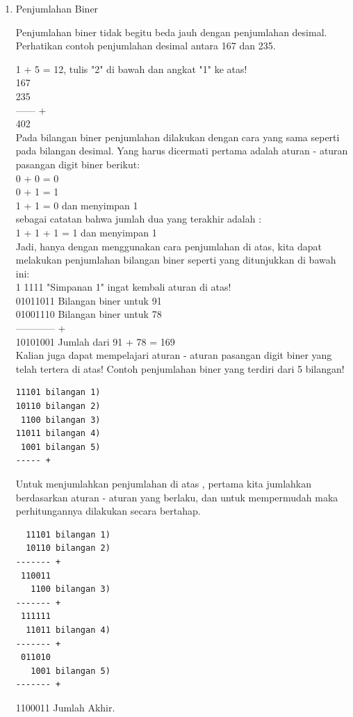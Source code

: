 \begin{enumerate}[label=(\alph*)]
\begin{enumerate}

\item Penjumlahan Biner

\qquad Penjumlahan biner tidak begitu beda jauh dengan penjumlahan desimal. Perhatikan contoh penjumlahan desimal antara 167 dan 235.

1  + 5 = 12, tulis "2" di bawah dan angkat "1" ke atas! \\

167 \\
235 \\
------ + \\
402 \\

\qquad Pada bilangan biner penjumlahan dilakukan dengan cara yang sama seperti pada bilangan desimal. Yang harus dicermati pertama adalah aturan - aturan pasangan digit biner berikut:\\
0 + 0 = 0 \\
0 + 1 = 1 \\
1 + 1 = 0 \textrightarrow dan menyimpan 1 \\

sebagai catatan bahwa jumlah dua yang terakhir adalah : \\
1 + 1 + 1 = 1 \textrightarrow dan menyimpan 1 \\

\qquad Jadi, hanya dengan menggunakan cara penjumlahan di atas, kita dapat melakukan penjumlahan bilangan biner seperti yang ditunjukkan di bawah ini: \\
1 1111 \textrightarrow "Simpanan 1" ingat kembali aturan di atas! \\
01011011 \textrightarrow Bilangan biner untuk 91 \\
01001110 \textrightarrow Bilangan biner untuk 78 \\
------------ + \\
10101001 \textrightarrow Jumlah dari 91 + 78 = 169 \\

\qquad Kalian juga dapat mempelajari aturan - aturan pasangan digit biner yang telah tertera di atas! Contoh penjumlahan biner yang terdiri dari 5 bilangan!\\
\begin{verbatim}
11101 bilangan 1)
10110 bilangan 2) 
 1100 bilangan 3)
11011 bilangan 4)
 1001 bilangan 5)
----- +
\end{verbatim}

\qquad Untuk menjumlahkan penjumlahan di atas , pertama kita jumlahkan berdasarkan aturan - aturan yang berlaku, dan untuk mempermudah maka perhitungannya dilakukan secara bertahap. \\
\begin{verbatim}
  11101 bilangan 1)
  10110 bilangan 2)
------- +
 110011
   1100 bilangan 3)
------- +
 111111
  11011 bilangan 4)
------- +
 011010
   1001 bilangan 5)
------- +
\end{verbatim}
1100011 \textrightarrow Jumlah Akhir. \\


\end{enumerate}
\end{enumerate}
